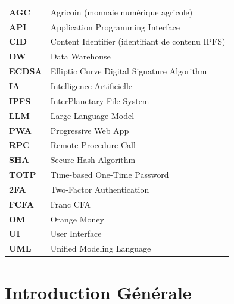 \documentclass[12pt,a4paper]{report}
\begin{document}
\begin{tabular}{p{3cm} p{10cm}}
  \textbf{AGC}   & Agricoin (monnaie numérique agricole)            \\
  \textbf{API}   & Application Programming Interface                \\
  \textbf{CID}   & Content Identifier (identifiant de contenu IPFS) \\
  \textbf{DW}    & Data Warehouse                                   \\
  \textbf{ECDSA} & Elliptic Curve Digital Signature Algorithm       \\
  \textbf{IA}    & Intelligence Artificielle                        \\
  \textbf{IPFS}  & InterPlanetary File System                       \\
  \textbf{LLM}   & Large Language Model                             \\
  \textbf{PWA}   & Progressive Web App                              \\
  \textbf{RPC}   & Remote Procedure Call                            \\
  \textbf{SHA}   & Secure Hash Algorithm                            \\
  \textbf{TOTP}  & Time-based One-Time Password                     \\
  \textbf{2FA}   & Two-Factor Authentication                        \\
  \textbf{FCFA}  & Franc CFA                                        \\
  \textbf{OM}    & Orange Money                                     \\
  \textbf{UI}    & User Interface                                   \\
  \textbf{UML}   & Unified Modeling Language                        \\
\end{tabular}

\clearpage

\setcounter{page}{1}
\pagestyle{fancy}

\chapter*{Introduction Générale}
\end{document}
